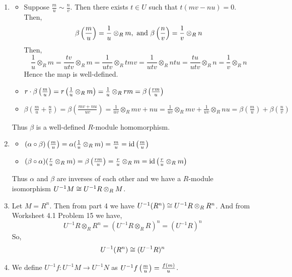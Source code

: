 \documentclass[Notebook.tex]{subfiles}
\begin{document}
\begin{solution}
\begin{enumerate}
		\item \begin{itemize}
			\item Suppose $\frac{m}{u} \sim \frac{n}{v}$. Then there exists $t \in U$ such that $t(mv - nu) = 0$. Then, 
			\[\beta\left(\frac{m}{u}\right) = \frac{1}{u} \otimes_R m, \text{ and } \beta\left(\frac{n}{v}\right) = \frac{1}{v} \otimes_R n\]
			Then, 
			\[ \frac{1}{u} \otimes_R m =  \frac{tv}{utv} \otimes_R m =  \frac{1}{utv} \otimes_R tmv =  \frac{1}{utv} \otimes_R ntu = \frac{tu}{utv} \otimes_R n = \frac{1}{v} \otimes_R n\]
			Hence the map is well-defined. 
			\item $r \cdot \beta\left(\frac{m}{u}\right) = r \left(\frac{1}{u} \otimes_R m\right)  = \frac{1}{u} \otimes_R rm = \beta\left(\frac{rm}{u}\right)$ 
			\item $\beta\left(\frac{m}{u} + \frac{n}{v}\right) = \beta\left(\frac{mv+ nu}{uv}\right)  = \frac{1}{uv} \otimes_R mv + nu = \frac{1}{uv} \otimes_R mv + \frac{1}{uv} \otimes_R nu  = \beta\left(\frac{m}{u}\right) + \beta\left(\frac{n}{v}\right)$
		\end{itemize}
		Thus $\beta$ is a well-defined $R$-module homomorphism. 

		\item \begin{itemize}
			\item $(\alpha \circ \beta) \left(\frac{m}{u}\right) = \alpha(\frac{1}{u} \otimes_R m) = \frac{m}{u} = \operatorname{id}\left(\frac{m}{u}\right)$
			\item $(\beta \circ \alpha) (\frac{r}{u} \otimes_R m) = \beta\left(\frac{rm}{u}\right) = \frac{r}{u} \otimes_R m = \operatorname{id} \left(\frac{r}{u} \otimes_R m\right)$
		\end{itemize}
		Thus $\alpha$ and $\beta$ are inverses of each other and we have a $R$-module isomorphism $U^{-1}M \cong U^{-1}R \otimes_RM$. 

		\item Let $M = R^n$. Then from part 4 we have $U^{-1}(R^n) \cong U^{-1}R \otimes_R R^n$. And from Worksheet 4.1 Problem 15 we have, 
		\[U^{-1}R \otimes_R R^n = (U^{-1}R \otimes_R R)^n = (U^{-1}R)^n\]
		So, 
		\[U^{-1}(R^n) \cong  (U^{-1}R)^n\]

		\item We define $U^{-1}f:U^{-1}M\to U^{-1}N$ as $U^{-1}f\left(\frac{m}{u}\right) = \frac{f(m)}{u}$. 
	\end{enumerate}
\end{solution}
\end{document}
